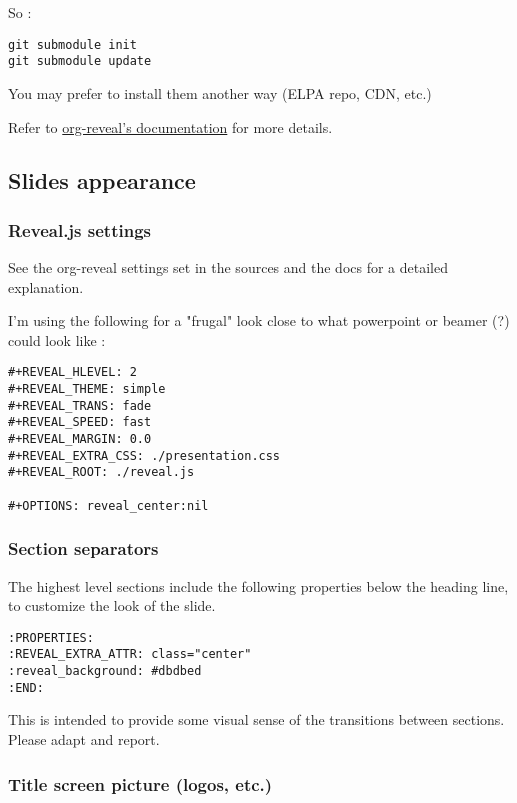 \documentclass[a4paper]{article}
\newenvironment{NOTES}{\begin{lrbox}{\mybox}\begin{minipage}{0.9\textwidth}\begin{shaded}}{\end{shaded}\end{minipage}\end{lrbox}\fbox{\usebox{\mybox}}}
\begin{document}
So :
\begin{verbatim}
git submodule init
git submodule update
\end{verbatim}
You may prefer to install them another way (ELPA repo, CDN, etc.)

\begin{NOTES}
Refer to \href{https://github.com/yjwen/org-reveal/\#requirements-and-installation}{org-reveal's documentation} for more details.
\end{NOTES}

\subsection{Slides appearance}
\label{sec:org01160f2}

\subsubsection{Reveal.js settings}
\label{sec:org03f4ea8}

See the org-reveal settings set in the sources and the docs for a detailed explanation.

I'm using the following for a "frugal" look close to what
powerpoint or beamer (?) could look like :

\begin{verbatim}
#+REVEAL_HLEVEL: 2
#+REVEAL_THEME: simple
#+REVEAL_TRANS: fade
#+REVEAL_SPEED: fast
#+REVEAL_MARGIN: 0.0
#+REVEAL_EXTRA_CSS: ./presentation.css
#+REVEAL_ROOT: ./reveal.js

#+OPTIONS: reveal_center:nil 
\end{verbatim}

\subsubsection{Section separators}
\label{sec:org1c77ec1}

The highest level sections include the following properties below the heading line, to customize the look of the slide. 

\begin{verbatim}
:PROPERTIES:
:REVEAL_EXTRA_ATTR: class="center"
:reveal_background: #dbdbed
:END:
\end{verbatim}

This is intended to provide some visual sense of the transitions between sections. Please adapt and report.

\subsubsection{Title screen picture (logos, etc.)}
\label{sec:org2c4149d}
\end{document}
